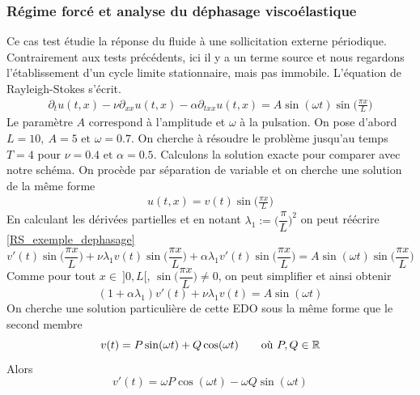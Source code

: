 \subsubsection{Régime forcé et analyse du déphasage viscoélastique}
Ce cas test étudie la réponse du fluide à une sollicitation externe périodique. Contrairement aux tests précédents, ici il y a un terme source et nous regardons l’établissement d’un cycle limite stationnaire, mais pas immobile. L'équation de Rayleigh-Stokes s'écrit. 
\begin{eqnarray}\label{RS_exemple_dephasage}
    \partial_tu(t,x) - \nu \partial_{xx}u(t,x) - \alpha \partial_{txx}u(t,x) = A \sin(\omega t)\sin\Big(\frac{\pi x}{L}\Big)
\end{eqnarray}
Le paramètre $A$ correspond à l'amplitude et $\omega$ à la pulsation. On pose d'abord $L= 10, \ A=5 \text{ et } \omega = 0.7$. On cherche à résoudre le problème jusqu'au temps $T=4$ pour $\nu = 0.4 \text{ et } \alpha=0.5$.
Calculons la solution exacte pour comparer avec notre schéma. On procède par séparation de variable et on cherche une solution de la même forme
\begin{eqnarray*}
    u(t,x) = v(t) \sin\Big(\frac{\pi x}{L}\Big)
\end{eqnarray*}
En calculant les dérivées partielles et en notant $\lambda_1 := \Big(\dfrac{\pi}{L} \Big)^2$ on peut réécrire \eqref{RS_exemple_dephasage}
\begin{equation*}
    v'(t) \sin\Big(\frac{\pi x}{L}\Big) + \nu \lambda_1 v(t)\sin\Big(\frac{\pi x}{L}\Big) + \alpha \lambda_1 v'(t)\sin\Big(\frac{\pi x}{L}\Big) = A\sin(\omega t)\sin\Big(\frac{\pi x}{L}\Big)
\end{equation*}
Comme pour tout $x \in \ ]0,L[$, $\sin\Big(\dfrac{\pi x}{L}\Big) \neq 0$, on peut simplifier et ainsi obtenir
\begin{equation*}
    (1 + \alpha \lambda_1)v'(t) + \nu \lambda_1v(t) = A \sin(\omega t)
\end{equation*}
On cherche une solution particulière de cette EDO sous la même forme que le second membre
\begin{equation*}
    v(t) = P \sin(\omega t) + Q\cos(\omega t) \ \ \ \ \ \text{ où } P, Q \in \mathbb{R}
\end{equation*}
Alors 
\begin{equation*}
    v'(t) = \omega P \cos(\omega t) - \omega Q\sin(\omega t)
\end{equation*}
